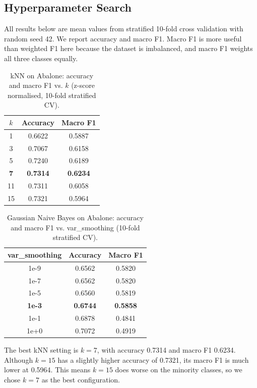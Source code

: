 \documentclass[11pt,letterpaper]{article}
\begin{document}
\subsection{Hyperparameter Search}

All results below are mean values from stratified 10-fold cross validation
with random seed 42. We report accuracy and macro F1. Macro F1 is more useful
than weighted F1 here because the dataset is imbalanced, and macro F1 weights
all three classes equally.

\begin{table}[h]
\centering
\caption{kNN on Abalone: accuracy and macro F1 vs. $k$ (z-score normalised, 10-fold stratified CV).}
\begin{tabular}{ccc}
\hline
$k$ & Accuracy & Macro F1 \\
\hline
1  & 0.6622 & 0.5887 \\
3  & 0.7067 & 0.6158 \\
5  & 0.7240 & 0.6189 \\
\rowcolor{gray!25}
\textbf{7}  & \textbf{0.7314} & \textbf{0.6234} \\
11 & 0.7311 & 0.6058 \\
15 & 0.7321 & 0.5964 \\
\hline
\end{tabular}
\end{table}

\begin{table}[h]
\centering
\caption{Gaussian Naive Bayes on Abalone: accuracy and macro F1 vs. var\_smoothing (10-fold stratified CV).}
\begin{tabular}{ccc}
\hline
var\_smoothing & Accuracy & Macro F1 \\
\hline
1e-9  & 0.6562 & 0.5820 \\
1e-7  & 0.6562 & 0.5820 \\
1e-5  & 0.6560 & 0.5819 \\
\rowcolor{gray!25}
\textbf{1e-3} & \textbf{0.6744} & \textbf{0.5858} \\
1e-1  & 0.6878 & 0.4841 \\
1e+0  & 0.7072 & 0.4919 \\
\hline
\end{tabular}
\end{table}

The best kNN setting is $k=7$, with accuracy 0.7314 and macro F1 0.6234.
Although $k=15$ has a slightly higher accuracy of 0.7321, its macro F1 is much
lower at 0.5964. This means $k=15$ does worse on the minority classes, so we
chose $k=7$ as the best configuration.
\end{document}
